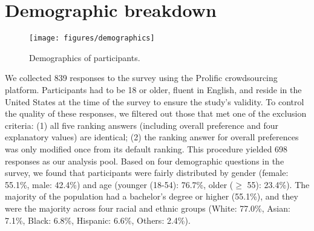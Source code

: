 

\clearpage
\section{Demographic breakdown}\label{sec:demo-breaks}

\begin{figure}[H]%
\centering
\texttt{[image: figures/demographics]}
\vspace{-1em}
\caption{Demographics of participants.}\label{fig:demographics}
\vspace{-1em}
\end{figure}

We collected 839 responses to the survey using the Prolific crowdsourcing platform. Participants had to be 18 or older, fluent in English, and reside in the United States at the time of the survey to ensure the study's validity. To control the quality of these responses, we filtered out those that met one of the exclusion criteria: (1) all five ranking answers (including overall preference and four explanatory values) are identical; (2) the ranking answer for overall preferences was only modified once from its default ranking. This procedure yielded 698 responses as our analysis pool. Based on four demographic questions in the survey, we found that participants were fairly distributed by gender (female: 55.1\%, male: 42.4\%) and age (younger (18-54): 76.7\%, older ($\ge$ 55): 23.4\%).  The majority of the population had a bachelor's degree or higher (55.1\%), and they were the majority across four racial and ethnic groups (White: 77.0\%, Asian: 7.1\%, Black: 6.8\%, Hispanic: 6.6\%, Others: 2.4\%).





